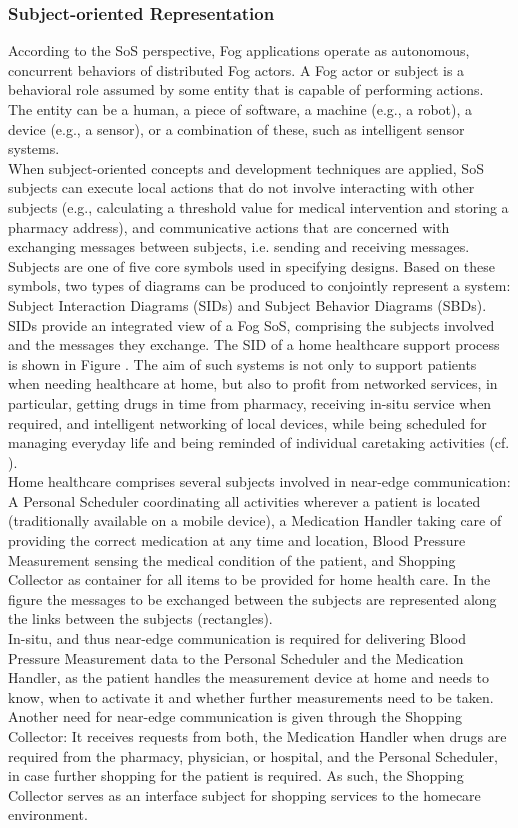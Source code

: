 \subsubsection{Subject-oriented Representation}
According to the SoS perspective, Fog applications operate as autonomous, concurrent behaviors of distributed Fog actors. A Fog actor or subject is a behavioral role assumed by some entity that is capable of performing actions. The entity can be a human, a piece of software, a machine (e.g., a robot), a device (e.g., a sensor), or a combination of these, such as intelligent sensor systems.
\\
When subject-oriented concepts and development techniques are applied, SoS subjects can execute local actions that do not involve interacting with other subjects (e.g., calculating a threshold value for medical intervention and storing a pharmacy address), and communicative actions that are concerned with exchanging messages between subjects, i.e. sending and receiving messages. Subjects are one of five core symbols used in specifying designs. Based on these symbols, two types of diagrams can be produced to conjointly represent a system: Subject Interaction Diagrams (SIDs) and Subject Behavior Diagrams (SBDs).
\\
SIDs provide an integrated view of a Fog SoS, comprising the subjects involved and the messages they exchange. The SID of a home healthcare support process is shown in Figure . The aim of such systems is not only to support patients when needing healthcare at home, but also to profit from networked services, in particular, getting drugs in time from pharmacy, receiving in-situ service when required, and intelligent networking of local devices, while being scheduled for managing everyday life and being reminded of individual caretaking activities (cf. \cite{article:DesignHealth}).
\\
Home healthcare comprises several subjects involved in near-edge communication: A Personal Scheduler coordinating all activities wherever a patient is located (traditionally available on a mobile device), a Medication Handler taking care of providing the correct medication at any time and location, Blood Pressure Measurement sensing the medical condition of the patient, and Shopping Collector as container for all items to be provided for home health care. In the figure the messages to be exchanged between the subjects are represented along the links between the subjects (rectangles).
\\
In-situ, and thus near-edge communication is required for delivering Blood Pressure Measurement data to the Personal Scheduler and the Medication Handler, as the patient handles the measurement device at home and needs to know, when to activate it and whether further measurements need to be taken. Another need for near-edge communication is given through the Shopping Collector: It receives requests from both, the Medication Handler when drugs are required from the pharmacy, physician, or hospital, and the Personal Scheduler, in case further shopping for the patient is required. As such, the Shopping Collector serves as an interface subject for shopping services to the homecare environment.

